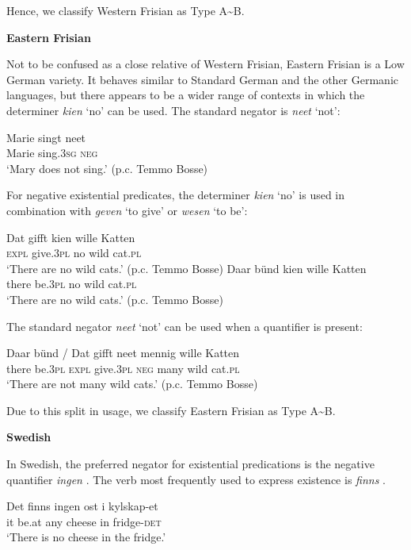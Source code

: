 \documentclass[output=paper]{langsci/langscibook}
\begin{document}
\begin{unindented}
Hence, we classify Western Frisian as Type A{\textasciitilde}B.

\textbf{Eastern Frisian}

Not to be confused as a close relative of Western Frisian, Eastern Frisian is a Low German variety. It behaves similar to Standard German and the other Germanic languages, but there appears to be a wider range of contexts in which the determiner \textit{kien} `no' can be used. The standard negator is \textit{neet} `not':
%
\begin{exe}\ex \gll Marie singt neet \\
Marie sing.\textsc{3sg} \textsc{neg} \\
    \glt `Mary does not sing.' (p.c. Temmo Bosse)
    \end{exe} 

For negative existential predicates, the determiner \textit{kien} `no' is used in combination with \textit{geven} `to give' or \textit{wesen} `to be':
%
\begin{exe}\ex \gll Dat gifft kien wille Katten \\
\textsc{expl}  give.\textsc{3pl} no wild cat.\textsc{pl} \\
    \glt `There are no wild cats.' (p.c. Temmo Bosse)
\ex \gll Daar bünd   kien wille Katten \\
there be.\textsc{3pl} no   wild  cat.\textsc{pl} \\
    \glt `There are no wild cats.' (p.c. Temmo Bosse)
    \end{exe}

The standard negator \textit{neet} `not' can be used when a quantifier is present:
%
\begin{exe}\ex \gll Daar bünd / Dat gifft neet mennig wille Katten \\
there be.\textsc{3pl} {} \textsc{expl} give.\textsc{3pl} \textsc{neg} many     wild cat\textsc{.pl} \\
    \glt `There are not many wild cats.' (p.c. Temmo Bosse)
    \end{exe}

Due to this split in usage, we classify Eastern Frisian as Type A{\textasciitilde}B. 

\textbf{Swedish}

In Swedish, the preferred negator for existential predications is the negative quantifier \textit{ingen} \citep{Bordal2017}. The verb most frequently used to express existence is \textit{finns} \citep[9]{Bordal2017}. 
%
\begin{exe}\ex \gll Det finns ingen ost i   kylskap-et \\
it be.at any cheese in fridge-\textsc{det} \\
    \glt `There is no cheese in the fridge.' \citep[115]{Veselinova2013}
    \end{exe}


\end{unindented}
\end{document}
